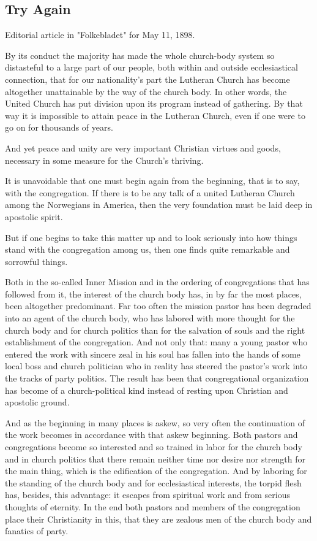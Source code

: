 
\subsection{Try Again}

Editorial article in "Folkebladet" for May 11, 1898.

By its conduct the majority has made the whole church-body system so distasteful to a large part of our people, both within and outside ecclesiastical connection, that for our nationality’s part the Lutheran Church has become altogether unattainable by the way of the church body. In other words, the United Church has put division upon its program instead of gathering. By that way it is impossible to attain peace in the Lutheran Church, even if one were to go on for thousands of years.

And yet peace and unity are very important Christian virtues and goods, necessary in some measure for the Church’s thriving.

It is unavoidable that one must begin again from the beginning, that is to say, with the congregation. If there is to be any talk of a united Lutheran Church among the Norwegians in America, then the very foundation must be laid deep in apostolic spirit.

But if one begins to take this matter up and to look seriously into how things stand with the congregation among us, then one finds quite remarkable and sorrowful things.

Both in the so-called Inner Mission and in the ordering of congregations that has followed from it, the interest of the church body has, in by far the most places, been altogether predominant. Far too often the mission pastor has been degraded into an agent of the church body, who has labored with more thought for the church body and for church politics than for the salvation of souls and the right establishment of the congregation. And not only that: many a young pastor who entered the work with sincere zeal in his soul has fallen into the hands of some local boss and church politician who in reality has steered the pastor’s work into the tracks of party politics. The result has been that congregational organization has become of a church-political kind instead of resting upon Christian and apostolic ground.

And as the beginning in many places is askew, so very often the continuation of the work becomes in accordance with that askew beginning. Both pastors and congregations become so interested and so trained in labor for the church body and in church politics that there remain neither time nor desire nor strength for the main thing, which is the edification of the congregation. And by laboring for the standing of the church body and for ecclesiastical interests, the torpid flesh has, besides, this advantage: it escapes from spiritual work and from serious thoughts of eternity. In the end both pastors and members of the congregation place their Christianity in this, that they are zealous men of the church body and fanatics of party.

